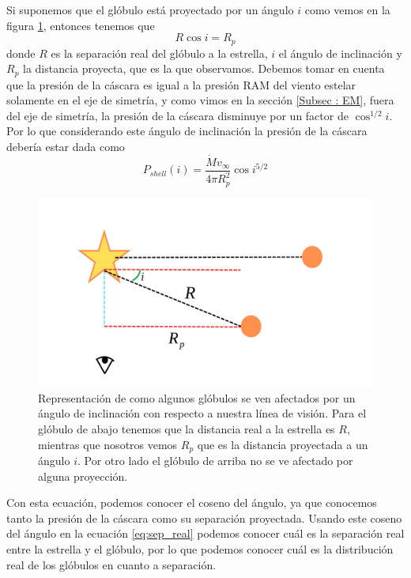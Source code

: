 \documentclass{book}
\begin{document}
Si suponemos que el glóbulo está proyectado por un ángulo $i$ como vemos en la figura \ref{Ang proyeccion}, entonces tenemos que 
\begin{equation}
R\cos i=R_p
\end{equation}\label{eq:sep_real}
donde $R$ es la separación real del glóbulo a la estrella, $i$ el ángulo de inclinación y $R_p$ la distancia proyecta, que es la que observamos. Debemos tomar en cuenta que la presión de la cáscara es igual a la presión RAM del viento estelar solamente en el eje de simetría, y como vimos en la sección \ref{Subsec : EM}, fuera del eje de simetría, la presión de la cáscara disminuye por un factor de $\cos^{1/2}i$. Por lo que considerando este ángulo de inclinación la presión de la cáscara debería estar dada como 
\begin{equation}
P_{shell}(i)=\frac{\dot{M}v_\infty}{4\pi R_p^2}\cos{i}^{5/2}
\end{equation}\label{eq:cos 5_2}

\begin{figure}[htb]
    \centering
    \includegraphics[width=\textwidth]{artesanales/ImgFi01-6.pdf}
    \caption{Representación de como algunos glóbulos se ven afectados por un ángulo de inclinación con respecto a nuestra línea de visión. Para el glóbulo de abajo tenemos que la distancia real a la estrella es $R$, mientras que nosotros vemos $R_p$ que es la distancia proyectada a un ángulo $i$. Por otro lado el glóbulo de arriba no se ve afectado por alguna proyección.}
    \label{Ang proyeccion}
\end{figure}

Con esta ecuación, podemos conocer el coseno del ángulo, ya que conocemos tanto la presión de la cáscara como su separación proyectada. Usando este coseno del ángulo en la ecuación \ref{eq:sep_real} podemos conocer cuál es la separación real entre la estrella y el glóbulo, por lo que podemos conocer cuál es la distribución real de los glóbulos en cuanto a separación.  
\end{document}
